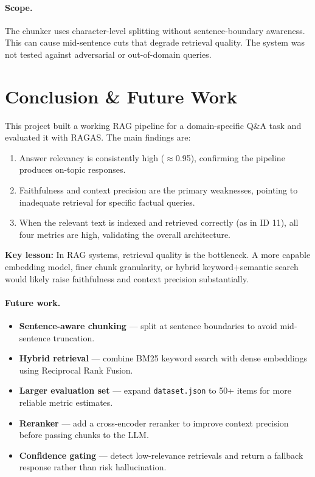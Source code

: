 \documentclass[11pt,a4paper]{article}
\begin{document}
\paragraph{Scope.}
The chunker uses character-level splitting without sentence-boundary awareness.
This can cause mid-sentence cuts that degrade retrieval quality.  The system was
not tested against adversarial or out-of-domain queries.

\section{Conclusion \& Future Work}

This project built a working RAG pipeline for a domain-specific Q\&A task and
evaluated it with RAGAS.  The main findings are:

\begin{enumerate}
    \item Answer relevancy is consistently high ($\approx$0.95), confirming the
          pipeline produces on-topic responses.
    \item Faithfulness and context precision are the primary weaknesses, pointing
          to inadequate retrieval for specific factual queries.
    \item When the relevant text is indexed and retrieved correctly (as in ID 11),
          all four metrics are high, validating the overall architecture.
\end{enumerate}

\noindent \textbf{Key lesson:} In RAG systems, retrieval quality is the bottleneck.
A more capable embedding model, finer chunk granularity, or hybrid
keyword+semantic search would likely raise faithfulness and context precision
substantially.

\paragraph{Future work.}
\begin{itemize}
    \item \textbf{Sentence-aware chunking} --- split at sentence boundaries to avoid
          mid-sentence truncation.
    \item \textbf{Hybrid retrieval} --- combine BM25 keyword search with dense
          embeddings using Reciprocal Rank Fusion.
    \item \textbf{Larger evaluation set} --- expand \texttt{dataset.json} to 50+
          items for more reliable metric estimates.
    \item \textbf{Reranker} --- add a cross-encoder reranker to improve context
          precision before passing chunks to the LLM.
    \item \textbf{Confidence gating} --- detect low-relevance retrievals and return
          a fallback response rather than risk hallucination.
\end{itemize}
\end{document}
